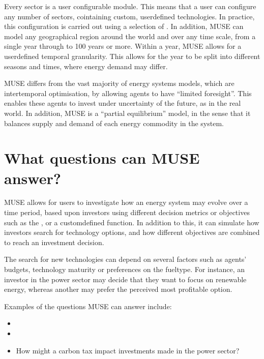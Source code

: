 \documentclass[letterpaper,10pt,english]{sphinxmanual}
\begin{document}
Every sector is a user configurable module. This means that a user can configure any number of sectors, cointaining custom, user\sphinxhyphen{}defined technologies. In practice, this configuration is carried out using a selection of {\hyperref[\detokenize{inputs/index:input-files}]{}}. In addition, MUSE can model any geographical region around the world and over any time scale, from a single year through to 100 years or more. Within a year, MUSE allows for a user\sphinxhyphen{}defined temporal granularity. This allows for the year to be split into different seasons and times, where energy demand may differ.

MUSE differs from the vast majority of energy systems models, which are intertemporal optimisation, by allowing agents to have “limited foresight”. This enables these agents to invest under uncertainty of the future, as in the real world. In addition, MUSE is a “partial equilibrium” model, in the sense that it balances supply and demand of each energy commodity in the system.


\section{What questions can MUSE answer?}
\label{\detokenize{overview:what-questions-can-muse-answer}}
MUSE allows for users to investigate how an energy system may evolve over a time period, based upon investors using different decision metrics or objectives such as the ,  or a custom\sphinxhyphen{}defined function. In addition to this, it can simulate how investors search for technology options, and how different objectives are combined to reach an investment decision.

The search for new technologies can depend on several factors such as agents’ budgets, technology maturity or preferences on the fuel\sphinxhyphen{}type. For instance, an investor in the power sector may decide that they want to focus on renewable energy, whereas another may prefer the perceived most profitable option.

Examples of the questions MUSE can answer include:
\begin{itemize}
\item {} 

\item {} 

\item {} 
How might a carbon tax impact investments made in the power sector?

\end{itemize}
\end{document}

